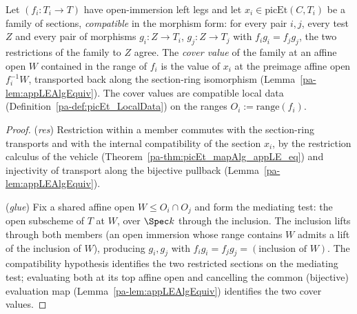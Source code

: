 \begin{definition}
  \label{pa-def:picEt_coverValue}
  \leanok

  Let \((f_i \colon T_i \to T)\) have open-immersion left legs and let
  \(x_i \in \mathrm{picEt}(C, T_i)\) be a family of sections, \emph{compatible} in the
  morphism form: for every pair \(i, j\), every test \(Z\) and every pair of morphisms
  \(g_i \colon Z \to T_i\), \(g_j \colon Z \to T_j\) with \(f_i g_i = f_j g_j\), the two
  restrictions of the family to \(Z\) agree. The \emph{cover value} of the family at an
  affine open \(W\) contained in the range of \(f_i\) is the value of \(x_i\) at the
  preimage affine open \(f_i^{-1}W\), transported back along the section-ring isomorphism
  (Lemma~\ref{pa-lem:appLEAlgEquiv}). The cover values are compatible local data
  (Definition~\ref{pa-def:picEt_LocalData}) on the ranges \(O_i := \mathrm{range}(f_i)\).
\end{definition}
\begin{proof}
  \leanok
  (\emph{res}) Restriction within a member commutes with the section-ring transports and
  with the internal compatibility of the section \(x_i\), by the restriction calculus of the
  vehicle (Theorem~\ref{pa-thm:picEt_mapAlg_appLE_eq}) and injectivity of transport along the
  bijective pullback (Lemma~\ref{pa-lem:appLEAlgEquiv}).

  (\emph{glue}) Fix a shared affine open \(W \le O_i \cap O_j\) and form the mediating test:
  the open subscheme of \(T\) at \(W\), over \(\Spec k\) through the inclusion. The
  inclusion lifts through both members (an open immersion whose range contains \(W\) admits
  a lift of the inclusion of \(W\)), producing \(g_i, g_j\) with
  \(f_i g_i = f_j g_j = (\text{inclusion of } W)\). The compatibility hypothesis identifies
  the two restricted sections on the mediating test; evaluating both at its top affine open
  and cancelling the common (bijective) evaluation map
  (Lemma~\ref{pa-lem:appLEAlgEquiv}) identifies the two cover values.
\end{proof}

